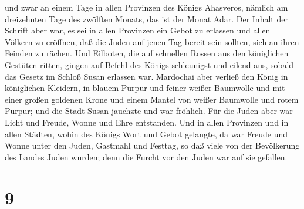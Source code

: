  und zwar an einem Tage in allen Provinzen des Königs
Ahasveros, nämlich am dreizehnten Tage des zwölften Monats, das ist der
Monat Adar.  Der Inhalt der Schrift aber war, es sei in
allen Provinzen ein Gebot zu erlassen und allen Völkern zu eröffnen, daß
die Juden auf jenen Tag bereit sein sollten, sich an ihren Feinden zu
rächen.  Und Eilboten, die auf schnellen Rossen aus den
königlichen Gestüten ritten, gingen auf Befehl des Königs schleunigst
und eilend aus, sobald das Gesetz im Schloß Susan erlassen war.
 Mardochai aber verließ den König in königlichen
Kleidern, in blauem Purpur und feiner weißer Baumwolle und mit einer
großen goldenen Krone und einem Mantel von weißer Baumwolle und rotem
Purpur; und die Stadt Susan jauchzte und war fröhlich. 
Für die Juden aber war Licht und Freude, Wonne und Ehre entstanden.
 Und in allen Provinzen und in allen Städten, wohin des
Königs Wort und Gebot gelangte, da war Freude und Wonne unter den Juden,
Gastmahl und Festtag, so daß viele von der Bevölkerung des Landes Juden
wurden; denn die Furcht vor den Juden war auf sie gefallen.

\hypertarget{section-8}{%
\section{9}\label{section-8}}

